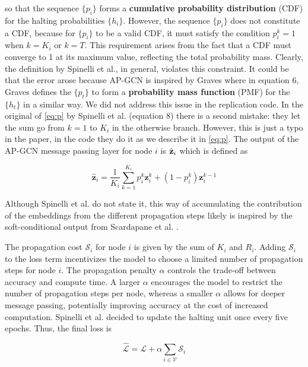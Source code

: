 \documentclass{gdl}
\begin{document}
\noindent so that the sequence $\{p_i\}$ forms a \textbf{cumulative probability distribution} (CDF) for the halting probabilities $\{h_i\}$. However, the sequence $\{p_i\}$ does not constitute a CDF, because for $\{p_i\}$ to be a valid CDF, it must satisfy the condition $p_i^k = 1$ when $k = K_i$ or $k = T$. This requirement arises from the fact that a CDF must converge to 1 at its maximum value, reflecting the total probability mass. Clearly, the definition by Spinelli et al., in general, violates this constraint. It could be that the error arose because AP-GCN is inspired by Graves \cite{graves2017} where in equation 6, Graves defines the $\{p_t\}$ to form a \textbf{probability mass function} (PMF) for the $\{h_t\}$ in a similar way. We did not address this issue in the replication code. In the original of \autoref{eq:p} by Spinelli et al. (equation 8) there is a second mistake: they let the sum go from $k=1$ to $K_i$ in the otherwise branch. However, this is just a typo in the paper, in the code they do it as we describe it in \autoref{eq:p}.
The output of the AP-GCN message passing layer for node $i$ is $\hat{\bf{z}}_i$ which is defined as

\begin{equation}
\hat{\mathbf{z}}_i = \frac{1}{K_i} \sum_{k=1}^{K_i} p_i^k \mathbf{z}^k_i + (1-p^k_i) \mathbf{z}_i^{k-1} 
\label{eq:aggregate}
\end{equation}

\noindent Although Spinelli et al. do not state it, this way of accumulating the contribution of the embeddings from the different propagation steps likely is inspired by the soft-conditional output from Scardapane et al. \cite{scardapane2020}.

 The propagation cost $\mathcal{S}_i$ for node $i$ is given by the sum of $K_i$ and $R_i$. Adding $\mathcal{S}_i$ to the loss term incentivizes the model to choose a limited number of propagation steps for node $i$. The propagation penalty $\alpha$ controls the trade-off between accuracy and compute time. A larger $\alpha$ encourages the model to restrict the number of propagation steps per node, whereas a smaller $\alpha$ allows for deeper message passing, potentially improving accuracy at the cost of increased computation. Spinelli et al. decided to update the halting unit once every five epochs. Thus, the final loss is

$$ \mathcal{\hat{L}} = \mathcal{L} + \alpha \sum_{i\in \mathcal{V}} \mathcal{S}_i $$
\end{document}
